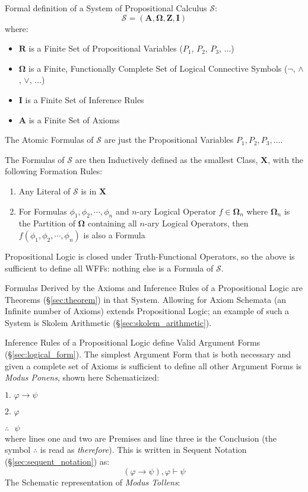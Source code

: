 Formal definition of a System of Propositional Calculus $\mathcal{S}$:
\[
    \mathcal{S} = (\mathbf{A},\mathbf{\Omega},\mathbf{Z},\mathbf{I})
\]
where:
\begin{itemize}
\item $\mathbf{R}$ is a Finite Set of Propositional Variables ($P_1$,
  $P_2$, $P_3$, $\ldots$)
\item $\mathbf{\Omega}$ is a Finite, Functionally Complete Set of
  Logical Connective Symbols ($\neg$, $\wedge$, $\vee$, $\ldots$)
\item $\mathbf{I}$ is a Finite Set of Inference Rules
\item $\mathbf{A}$ is a Finite Set of Axioms
\end{itemize}
The Atomic Formulas of $\mathcal{S}$ are just the Propositional
Variables $P_1, P_2, P_3, \ldots$.

The Formulas of $\mathcal{S}$ are then Inductively defined as the
smallest Class, $\mathbf{X}$, with the following Formation Rules:
\begin{enumerate}
\item Any Literal of $\mathcal{S}$ is in $\mathbf{X}$
\item For Formulas $\phi_1, \phi_2, \cdots, \phi_n$ and $n$-ary
  Logical Operator $f \in \mathbf{\Omega}_n$ where $\mathbf{\Omega}_n$
  is the Partition of $\mathbf{\Omega}$ containing all $n$-ary Logical
  Operators, then $f(\phi_1, \phi_2, \cdots, \phi_n)$ is also a
  Formula
\end{enumerate}
Propositional Logic is closed under Truth-Functional Operators, so the
above is sufficient to define all WFFs: nothing else is a Formula of
$\mathcal{S}$.

Formulas Derived by the Axioms and Inference Rules of a Propositional
Logic are Theorems (\S\ref{sec:theorem}) in that System. Allowing for
Axiom Schemata (an Infinite number of Axioms) extends Propositional
Logic; an example of such a System is Skolem Arithmetic
(\S\ref{sec:skolem_arithmetic}).

Inference Rules of a Propositional Logic define Valid Argument Forms
(\S\ref{sec:logical_form}). The simplest Argument Form that is both
necessary and given a complete set of Axioms is sufficient to define
all other Argument Forms is \emph{Modus Ponens}, shown here
Schematicized:

$\textrm{1. }\varphi \rightarrow \psi$

$\textrm{2. }\varphi$

$\therefore\textrm{ }\psi$ \\
where lines one and two are Premises and
line three is the Conclusion (the symbol $\therefore$ is read as
\emph{therefore}). This is written in Sequent Notation
(\S\ref{sec:sequent_notation}) as:
\[
  (\varphi \rightarrow \psi), \varphi \vdash \psi
\]
The Schematic representation of \emph{Modus Tollens}:

